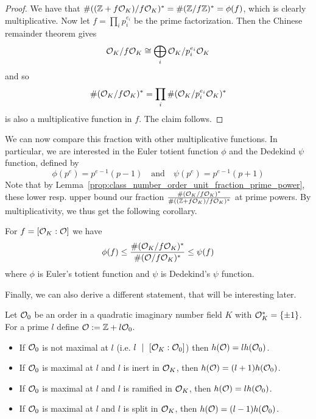 \begin{proof}
    We have that $\#((\mathbb{Z} + f\mathcal{O}_K)/f\mathcal{O}_K)^* = \#(\mathbb{Z}/f\mathbb{Z})^* = \phi(f)$, which is clearly multiplicative.
    Now let $f = \prod_i p_i^{e_i}$ be the prime factorization.
    Then the Chinese remainder theorem gives
    \begin{equation*}
        \mathcal{O}_K/f\mathcal{O}_K \cong \bigoplus_i \mathcal{O}_K/p_i^{e_i}\mathcal{O}_K
    \end{equation*}
    and so
    \begin{equation*}
        \#(\mathcal{O}_K/f\mathcal{O}_K)^* = \prod_i \#(\mathcal{O}_K/p_i^{e_i}\mathcal{O}_K)^*
    \end{equation*}
    is also a multiplicative function in $f$.
    The claim follows.
\end{proof}
We can now compare this fraction with other multiplicative functions.
In particular, we are interested in the Euler totient function $\phi$ and the Dedekind $\psi$ function, defined by
\begin{equation*}
    \phi(p^e) = p^{e - 1}(p - 1) \quad \text{and} \quad \psi(p^e) = p^{e - 1}(p + 1)
\end{equation*}
Note that by Lemma~\ref{prop:class_number_order_unit_fraction_prime_power}, these lower resp. upper bound our fraction $\frac {\#(\mathcal{O}_K/f\mathcal{O}_K)^*} {\#((\mathbb{Z} + f\mathcal{O}_K)/f\mathcal{O}_K)^*}$ at prime powers.
By multiplicativity, we thus get the following corollary.
\begin{corollary}
    \label{prop:unit_fraction_bound}
    For $f = [\mathcal{O}_K : \mathcal{O}]$ we have
    \begin{equation*}
        \phi(f) \leq \frac {\#(\mathcal{O}_K/f\mathcal{O}_K)^*} {\#(\mathcal{O}/f\mathcal{O}_K)^*} \leq \psi(f)
    \end{equation*}
    where $\phi$ is Euler's totient function and $\psi$ is Dedekind's $\psi$ function.
\end{corollary}
Finally, we can also derive a different statement, that will be interesting later.
\begin{prop}
    \label{prop:vulcano_level_class_numbers}
    Let $\mathcal{O}_0$ be an order in a quadratic imaginary number field $K$ with $\mathcal{O}_K^* = \{ \pm 1 \}$.
    For a prime $l$ define $\mathcal{O} := \mathbb{Z} + l\mathcal{O}_0$.
    \begin{itemize}
        \item If $\mathcal{O}_0$ is not maximal at $l$ (i.e. $l \ \mid \  [\mathcal{O}_K : \mathcal{O}_0]$) then $h(\mathcal{O}) = lh(\mathcal{O}_0)$.
        \item If $\mathcal{O}_0$ is maximal at $l$ and $l$ is inert in $\mathcal{O}_K$, then $h(\mathcal{O}) = (l + 1)h(\mathcal{O}_0)$.
        \item If $\mathcal{O}_0$ is maximal at $l$ and $l$ is ramified in $\mathcal{O}_K$, then $h(\mathcal{O}) = lh(\mathcal{O}_0)$.
        \item If $\mathcal{O}_0$ is maximal at $l$ and $l$ is split in $\mathcal{O}_K$, then $h(\mathcal{O}) = (l - 1)h(\mathcal{O}_0)$.
    \end{itemize} 
\end{prop}
